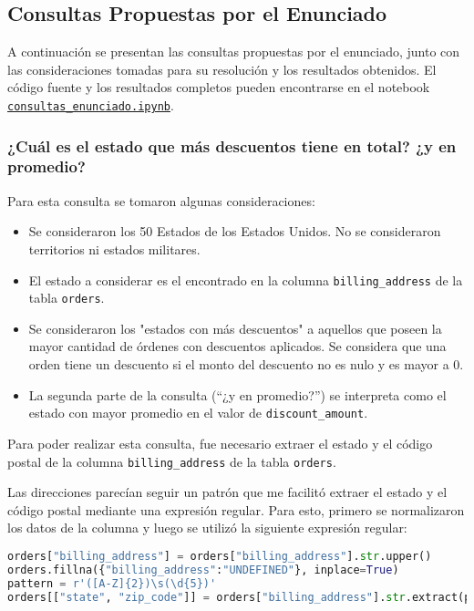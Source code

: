 \subsection{Consultas Propuestas por el Enunciado}

A continuación se presentan las consultas propuestas por el enunciado, junto con las consideraciones tomadas para su resolución y los resultados obtenidos. El código fuente y los resultados completos pueden encontrarse en el notebook \href{https://github.com/patricioibar/datos-tp1/blob/main/consultas_enunciado.ipynb}{\texttt{consultas\_enunciado.ipynb}}.

\subsubsection{¿Cuál es el estado que más descuentos tiene en total? ¿y en promedio?}

Para esta consulta se tomaron algunas consideraciones:
\begin{itemize}
    \item Se consideraron los 50 Estados de los Estados Unidos. No se consideraron territorios ni estados militares.
    \item El estado a considerar es el encontrado en la columna \texttt{billing\_address} de la tabla \texttt{orders}.
    \item Se consideraron los "estados con más descuentos" a aquellos que poseen la mayor cantidad de órdenes con descuentos aplicados. Se considera que una orden tiene un descuento si el monto del descuento no es nulo y es mayor a 0.
    \item La segunda parte de la consulta (``¿y en promedio?'') se interpreta como el estado con mayor promedio en el valor de \texttt{discount\_amount}.
\end{itemize}

Para poder realizar esta consulta, fue necesario extraer el estado y el código postal de la columna \texttt{billing\_address} de la tabla \texttt{orders}. 

Las direcciones parecían seguir un patrón que me facilitó extraer el estado y el código postal mediante una expresión regular.
Para esto, primero se normalizaron los datos de la columna y luego se utilizó la siguiente expresión regular:

\begin{lstlisting}[language=Python]
orders["billing_address"] = orders["billing_address"].str.upper()
orders.fillna({"billing_address":"UNDEFINED"}, inplace=True)
pattern = r'([A-Z]{2})\s(\d{5})'
orders[["state", "zip_code"]] = orders["billing_address"].str.extract(pattern)
\end{lstlisting}

